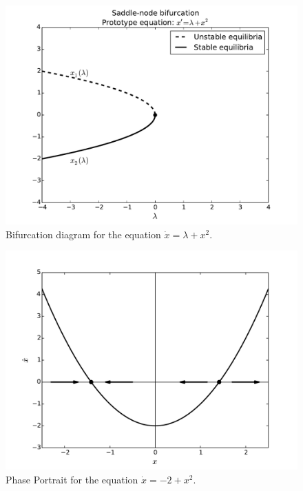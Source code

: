 \begin{figure}[ht]
\centering
\includegraphics[width=\textwidth]{SaddleNBifurcation.pdf}
\caption{Bifurcation diagram for the equation $\dot{x} = \lambda + x^2$.}
\label{bifurcation:sn}
\end{figure}

\begin{figure}[ht]
\centering
\includegraphics[width=\textwidth]{SaddleNPhasePortrait.pdf}
\caption{Phase Portrait for the equation $\dot{x} = -2 + x^2$.}
\label{phaseportrait:sn}
\end{figure}

